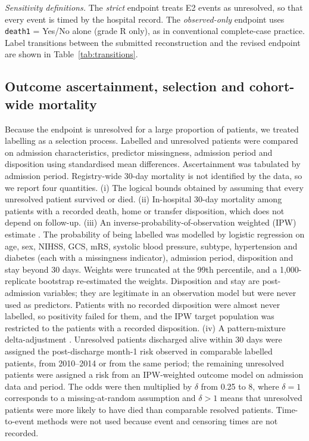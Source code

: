 \documentclass[preprint,10pt]{elsarticle}
\begin{document}
\emph{Sensitivity definitions.} The \emph{strict} endpoint treats E2 events as unresolved, so that every event is timed by the hospital record. The \emph{observed-only} endpoint uses \texttt{death1} = Yes/No alone (grade R only), as in conventional complete-case practice. Label transitions between the submitted reconstruction and the revised endpoint are shown in Table~\ref{tab:transitions}.



\subsection{Outcome ascertainment, selection and cohort-wide mortality}
\label{sec:selbias}
Because the endpoint is unresolved for a large proportion of patients, we treated labelling as a selection process. Labelled and unresolved patients were compared on admission characteristics, predictor missingness, admission period and disposition using standardised mean differences. Ascertainment was tabulated by admission period. Registry-wide 30-day mortality is not identified by the data, so we report four quantities. (i) The logical bounds obtained by assuming that every unresolved patient survived or died. (ii) In-hospital 30-day mortality among patients with a recorded death, home or transfer disposition, which does not depend on follow-up. (iii) An inverse-probability-of-observation weighted (IPW) estimate \cite{seaman2013ipw}. The probability of being labelled was modelled by logistic regression on age, sex, NIHSS, GCS, mRS, systolic blood pressure, subtype, hypertension and diabetes (each with a missingness indicator), admission period, disposition and stay beyond 30 days. Weights were truncated at the 99th percentile, and a 1,000-replicate bootstrap re-estimated the weights. Disposition and stay are post-admission variables; they are legitimate in an observation model but were never used as predictors. Patients with no recorded disposition were almost never labelled, so positivity failed for them, and the IPW target population was restricted to the \Nipwpop{} patients with a recorded disposition. (iv) A pattern-mixture delta-adjustment \cite{cro2020delta}. Unresolved patients discharged alive within 30 days were assigned the post-discharge month-1 risk observed in comparable labelled patients, from 2010--2014 or from the same period; the remaining unresolved patients were assigned a risk from an IPW-weighted outcome model on admission data and period. The odds were then multiplied by $\delta$ from 0.25 to 8, where $\delta=1$ corresponds to a missing-at-random assumption and $\delta>1$ means that unresolved patients were more likely to have died than comparable resolved patients. Time-to-event methods were not used because event and censoring times are not recorded.
\end{document}

